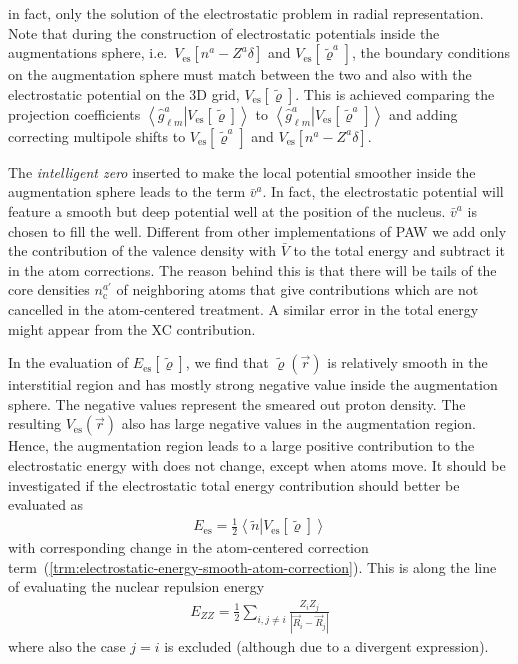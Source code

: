 \documentclass[oribibl]{llncs}
\newcommand{\um}[1]{_{\mathrm{#1}}}
\newcommand{\braket}[2]{\left\langle \left. #1 \right| #2 \right\rangle}
\begin{document}
in fact, only the solution of the electrostatic problem in radial representation. 
Note that during the construction of electrostatic potentials inside the augmentations sphere,
i.e.~$V\um{es}[n^a - Z^a \delta]$ and $V\um{es}[\tilde\varrho^a]$, the boundary conditions on the augmentation sphere must match between
the two and also with the electrostatic potential on the 3D grid, $V\um{es}[\tilde\varrho]$.
This is achieved comparing the projection coefficients $\braket{\hat g^a_{\ell m}}{V\um{es}[\tilde\varrho]}$ to $\braket{\hat g^a_{\ell m}}{V\um{es}[\tilde\varrho^a]}$ and adding correcting multipole shifts to $V\um{es}[\tilde\varrho^a]$ and $V\um{es}[n^a - Z^a\delta]$.

The \emph{intelligent zero} inserted to make the local potential smoother inside the augmentation sphere
leads to the term $\bar v^a$. In fact, the electrostatic potential will feature a smooth but deep potential well
at the position of the nucleus. $\bar v^a$ is chosen to fill the well.
Different from other implementations of \ac{PAW} we add only the contribution of the valence density
with $\bar V$ to the total energy and subtract it in the atom corrections.
The reason behind this is that there will be tails of the core densities $n^{a'}\um{c}$
of neighboring atoms that give contributions which are not cancelled in the atom-centered treatment.
A similar error in the total energy might appear from the \ac{XC} contribution.


In the evaluation of $E\um{es}[\tilde\varrho]$, 
we find that $\tilde\varrho(\vec r)$ is relatively smooth in the interstitial region
and has mostly strong negative value inside the augmentation sphere. 
The negative values represent the smeared out proton density.
The resulting $V\um{es}(\vec r)$ also has large negative values in the augmentation region.
Hence, the augmentation region leads to a large positive contribution to the
electrostatic energy with does not change, except when atoms move.
It should be investigated if the electrostatic total energy contribution should
better be evaluated as
\begin{align}
  E\um{es} = \frac{1}{2} \braket{ \tilde n }{ V\um{es}[\tilde\varrho] } 
\end{align}
with corresponding change in the atom-centered correction term~(\ref{trm:electrostatic-energy-smooth-atom-correction}).
This is along the line of evaluating the nuclear repulsion energy
\begin{align}
  E_{ZZ} = \frac{1}{2} \sum_{i, j \neq i} \frac{Z_i Z_j}{|\vec R_i - \vec R_j|}
\end{align}
where also the case $j = i$ is excluded (although due to a divergent expression).
\end{document}
